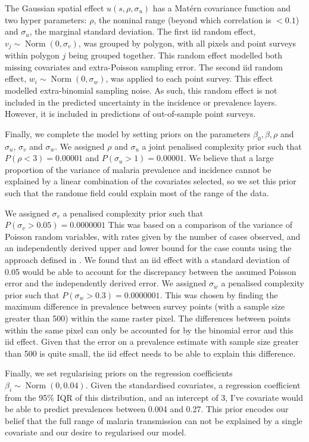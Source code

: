 \documentclass[10pt,letterpaper]{article}
\begin{document}
The Gaussian spatial effect $u(s, \rho, \sigma_u)$ has a Mat\'ern covariance function and two hyper parameters: $\rho$, the nominal range (beyond which correlation is $< 0.1$) and $\sigma_u$, the marginal standard deviation.
The first iid random effect, $v_j \sim \operatorname{Norm}(0, \sigma_v)$,  was grouped by polygon, with all pixels and point surveys within polygon $j$ being grouped together.
This random effect modelled both missing covariates and extra-Poisson sampling error. 
The second iid random effect, $w_i \sim \operatorname{Norm}(0, \sigma_w)$, was applied to each point survey.
This effect modelled extra-binomial sampling noise.
As such, this random effect is not included in the predicted uncertainty in the incidence or prevalence layers.
However, it is included in predictions of out-of-sample point surveys.

Finally, we complete the model by setting priors on the parameters $\beta_0, \beta, \rho$ and $\sigma_u$, $\sigma_v$ and $\sigma_w$.
We assigned $\rho$ and $\sigma_u$ a joint penalised complexity prior \cite{fuglstad2018constructing} such that $P(\rho < 3) = 0.00001$ and $P(\sigma_u > 1) = 0.00001$.
We believe that a large proportion of the variance of malaria prevalence and incidence cannot be explained by a linear combination of the covariates selected, so we set this prior such that the randome field could explain most of the range of the data.

We assigned $\sigma_v$ a penalised complexity prior \cite{simpson2017penalising} such that $P(\sigma_v > 0.05) = 0.0000001$
This was based on a comparison of the variance of Poisson random variables, with rates given by the number of cases observed, and an independently derived upper and lower bound for the case counts using the approach defined in \cite{cibulskis2011worldwide}.
We found that an iid effect with a standard deviation of 0.05 would be able to account for the discrepancy between the assumed Poisson error and the independently derived error.
We assigned $\sigma_w$ a penalised complexity prior such that $P(\sigma_w > 0.3) = 0.0000001$. 
This was chosen by finding the maximum difference in prevalence between survey points (with a sample size greater than 500) within the same raster pixel.
The differences between points within the same pixel can only be accounted for by the binomial error and this iid effect.
Given that the error on a prevalence estimate with sample size greater than 500 is quite small, the iid effect needs to be able to explain this difference.

Finally, we set regularising priors on the regression coefficients $\beta_i \sim \operatorname{ Norm}(0, 0.04)$. 
Given the standardised covariates, a regression coefficient from the 95\% IQR of this distribution, and an intercept of 3, I've covariate would be able to predict prevalences between 0.004 and 0.27. 
This prior encodes our belief that the full range of malaria transmission can not be explained by a single covariate and our desire to regularised our model.
\end{document}
